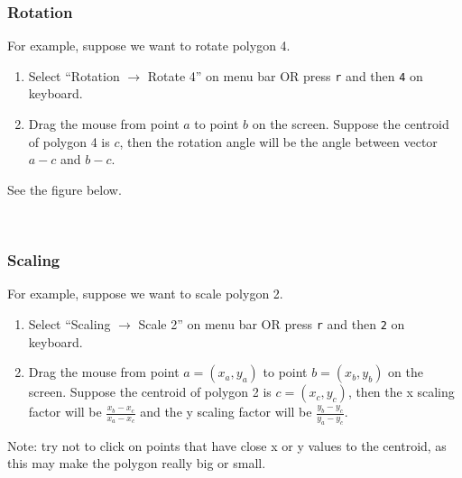 \documentclass[11pt]{article}
\begin{document}
\subsubsection{Rotation}

For example, suppose we want to rotate polygon 4. 

\begin{enumerate}
\item Select ``Rotation $\to$ Rotate 4'' on menu bar OR press
	\lstinline{r} and then \lstinline{4} on keyboard. 
\item Drag the mouse from point $a$ to point $b$ on the screen. Suppose the
	centroid of polygon 4 is $c$, then the rotation angle will be the angle
	between vector $a - c$ and $b - c$. 
\end{enumerate}

See the figure below. 

\


\subsubsection{Scaling}

For example, suppose we want to scale polygon 2. 

\begin{enumerate}
\item Select ``Scaling $\to$ Scale 2'' on menu bar OR press
	\lstinline{r} and then \lstinline{2} on keyboard. 
\item Drag the mouse from point $a = (x_a, y_a)$ to point $b = (x_b, y_b)$ on
	the screen. Suppose the centroid of polygon 2 is $c = (x_c, y_c)$, then the
	x scaling factor will be $\displaystyle\frac{x_b - x_c}{x_a - x_c}$ and the
	y scaling factor will be $\displaystyle\frac{y_b - y_c}{y_a - y_c}$. 
\end{enumerate}

Note: try not to click on points that have close x or y values to the centroid,
 as this may make the polygon really big or small. 
\end{document}
